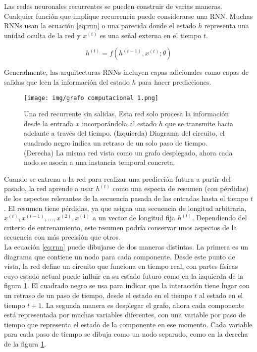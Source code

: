     
    Las redes neuronales recurrentes se pueden construir de varias maneras. Cualquier función que implique recurrencia puede considerarse una RNN. Muchas RNNs usan la ecuación \eqref{eq:rnn} o una parecida donde el estado $h$ representa una unidad oculta de la red y $x^{(t)}$ es una señal externa en el tiempo $t$.
        
            \begin{equation}\label{eq:rnn}
                h^{(t)} = f( h^{(t-1)} , x^{(t)} ; \theta)
            \end{equation}
            
    \noindent Generalmente, las arquitecturas RNNs incluyen capas adicionales como capas de salidas que leen la información del estado $h$ para hacer predicciones. \\
    
    
    
    \begin{figure}[H]
                \centering
                \texttt{[image: img/grafo computacional 1.png]}
                \caption{Una red recurrente sin salidas. Esta red solo procesa la información desde la entrada $x$ incorporándola al estado $h$ que se transmite hacia adelante a través del tiempo. (Izquierda) Diagrama del circuito, el cuadrado negro indica un retraso de un solo paso de tiempo. (Derecha) La misma red vista como un grafo desplegado, ahora cada nodo se asocia a una instancia temporal concreta. }
                \label{fig:grafo 1}
        \end{figure}
        
        
    Cuando se entrena a la red para realizar una predicción futura a partir del pasado, la red aprende a usar $h^{(t)}$ como una especia de resumen (con pérdidas) de los aspectos relevantes de la secuencia pasada de las entradas hasta el tiempo $t$. El resumen tiene pérdidas, ya que asigna una secuencia de longitud arbitraria, $x^{(t)},x^{(t-1)},...,x^{(2)},x^{(1)}$ a un vector de longitud fija $h^{(t)}$. Dependiendo del criterio de entrenamiento, este resumen podría conservar unos aspectos de la secuencia con más precisión que otros. \\
        
    La ecuación \ref{eq:rnn} puede dibujarse de dos maneras distintas. La primera es un diagrama que contiene un nodo para cada componente. Desde este punto de vista, la red define un circuito que funciona en tiempo real, con partes físicas cuyo estado actual puede influir en su estado futuro como en la izquierda de la figura \ref{fig:grafo 1}. El cuadrado negro se usa para indicar que la interacción tiene lugar con un retraso de un paso de tiempo, desde el estado en el tiempo $t$ al estado en el tiempo $t+1$. La segunda manera es desplegar el grafo, ahora cada componente está representada por muchas variables diferentes, con una variable por paso de tiempo que representa el estado de la componente en ese momento. Cada variable para cada paso de tiempo se dibuja como un nodo separado, como en la derecha de la figura \ref{fig:grafo 1}. \\ 
        
